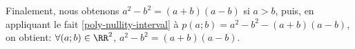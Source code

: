 \begin{example}
Finalement, nous obtenons $a^2 - b^2 = (a+b)(a-b)$ si $a > b$,
puis, 
en appliquant le fait \ref{poly-nullity-interval} à $p(a ; b) = a^2 - b^2 - (a+b)(a-b)$, 
on obtient: $\forall (a ; b) \in \RR^2$, $a^2 - b^2 = (a+b)(a-b)$.
\end{example}
